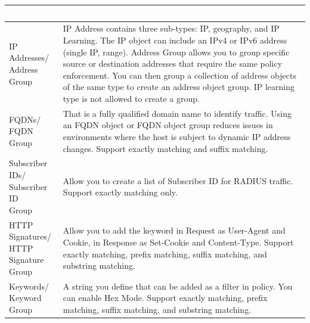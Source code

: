 \begin{longtable}{p{}|p{}}   
    \rowcolor{black}\multicolumn{1}{l!{\vlinewhite}}{\textcolor{white}{Policy Object}}  & \textcolor{white}{Description} \\\hline                                                                                                                                                          
    \tabincell{l}{IP Addresses/\\ Address Group} & IP Address contains three sub-types: IP, geography, and IP Learning. The IP object can include an IPv4 or IPv6 address (single IP, range). 
    Address Group allows you to group specific source or destination addresses that require the same policy enforcement. 
    You can then group a collection of address objects of the same type to create an address object group. IP learning type is not allowed to create a group.\\ \hline                                                                                                                                                                                                            
    \tabincell{l}{FQDNs/\\FQDN Group} & That is a fully qualified domain name to identify traffic. Using an FQDN object or FQDN object group reduces issues in environments where the host is subject to dynamic IP address changes. Support exactly matching and suffix matching.\\\hline 
    \tabincell{l}{Subscriber IDs/\\Subscriber ID\\ Group} & Allow you to create a list of Subscriber ID for RADIUS traffic. Support exactly matching only. \\\hline 
    \tabincell{l}{HTTP Signatures/\\HTTP Signature\\ Group} & Allow you to add the keyword in Request as User-Agent and Cookie, in Response as Set-Cookie and Content-Type. 
    Support exactly matching, prefix matching, suffix matching, and substring matching. \\\hline 
    \tabincell{l}{Keywords/\\Keyword Group} &  A string you define that can be added as a filter in policy. You can enable Hex Mode. 
    Support exactly matching, prefix matching, suffix matching, and substring matching.
    


\end{longtable}
